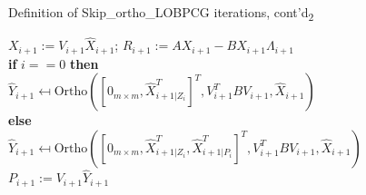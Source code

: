\documentclass[t,usepdftitle=false]{beamer}
\begin{document}
\begin{frame}{Definition of Skip\_ortho\_LOBPCG iterations, cont'd\textsubscript{2}}
\begin{itemize}
\begin{center}
{\begin{varwidth}{17cm}
\hspace*{.4cm}$X_{i+1}:=V_{i+1}\hat{X}_{i+1}$; $R_{i+1}:=AX_{i+1}-BX_{i+1}\Lambda_{i+1}$\tinyskip\\
\hspace*{.4cm}\textbf{if} $i==0$ \textbf{then}\\
\hspace*{.8cm}$\hat{Y}_{i+1}\mapsfrom\text{Ortho}([0_{m\times m},\hat{X}_{i+1|Z_i}^T]^T,V_{i+1}^TBV_{i+1},\hat{X}_{i+1})$\\
\hspace*{.4cm}\textbf{else}\\
\hspace*{.8cm}$\hat{Y}_{i+1}\mapsfrom\text{Ortho}([0_{m\times m},\hat{X}_{i+1|Z_i}^T,\hat{X}_{i+1|P_i}^T]^T,V_{i+1}^TBV_{i+1},\hat{X}_{i+1})$\\
\hspace*{.4cm}$P_{i+1}:=V_{i+1}\hat{Y}_{i+1}$
\end{varwidth}}\end{center}
\end{itemize}
\end{frame}
\end{document}
